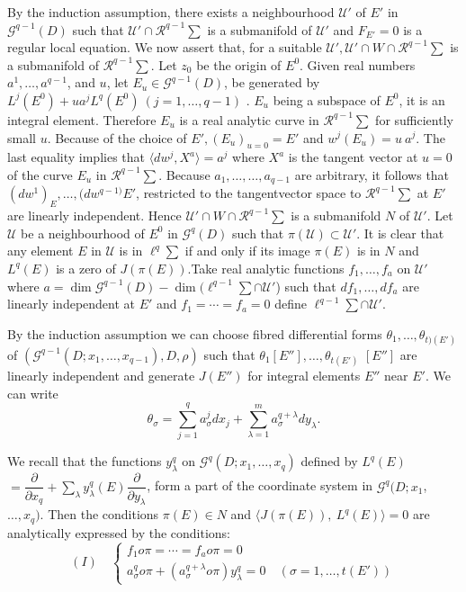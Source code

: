 By the induction assumption,  there exists a neighbourhood
$\mathscr{U}'$ of $E'$ in $\mathscr{G}^{q-1}(D)$ such that
$\mathscr{U}' \cap \mathscr{R}^{q-1} \sum$ is a submanifold of
$\mathscr{U}'$ and $F_{E'} = 0$ is a regular local equation. We now
assert that,  for a suitable $\mathscr{U}' ,  \mathscr{U}' \cap W \cap
\mathscr{R}^{q-1} \sum$ is a submanifold of $\mathscr{R}^{q-1}
\sum$. Let $z_0$ be the origin of $E^0$. Given real numbers $a^1,
\ldots,  a^{q-1}$,  and $u$,  let $E_u \in \mathscr{G}^{q-1}(D)$,  be
generated by $L^j (E^0)+ u a^j L^q (E^0) ~ (j = 1,  \ldots,  q-1)$
. $E_u$ being a subspace of $E^0$,  it is an integral
element. Therefore $E_u$ is a real analytic curve in
$\mathscr{R}^{q-1} \sum$ for sufficiently small $u$. Because of the
choice of $E' ,  (E_u)_{u = 0}= E'$ and $w^j (E_u) = u ~ a^j$. The
last equality implies that $\langle d w^j,  X^a \rangle = a^j$ where
$X^a$ is the tangent vector at $u = 0 $ of the curve $E_u$ in
$\mathscr{R}^{q-1} \sum$. Because $a_1,  \ldots , \ldots , a_{q-1}$
are arbitrary, it follows that $(dw^1)_E , \ldots , (dw^{q-1)} E'$,
restricted to the  tangent\pageoriginale vector space to $\mathscr{R}^{q-1} \sum$ at
$E'$ are linearly independent. Hence $\mathscr{U}' \cap W \cap
\mathscr{R}^{q-1} \sum$ is a submanifold $N$ of $\mathscr{U}'$. Let
$\mathscr{U}$ be a neighbourhood of $E^0$ in $\mathscr{G}^q (D)$ such
that $\pi (\mathscr{U}) \subset \mathscr{U}'$. It is clear that any
element $E$ in $\mathscr{U}$ is in $\ell^q \sum$ if and only if its
image $\pi (E)$ is in $N$ and $L^q (E)$ is a zero of $J (\pi
(E))$.Take real analytic functions $f_1,  \ldots ,  f_a$ on
$\mathscr{U}'$ where $a = \dim \mathscr{G}^{q-1} (D) - \dim
(\ell^{q-1} \sum \cap \mathscr{U}'$) such that $df_1,  \ldots ,  df_a$
are linearly independent at $E'$ and $f_1 = \cdots = f_a = 0$ define
$\ell ^{q-1} \sum \cap \mathscr{U}'$.  

By the induction assumption we can choose fibred differential forms
$\theta_1,  \ldots ,  \theta_{t )(E')}$ of $(\mathscr{G}^{q-1} (D; x_1
,  \ldots ,  x_{q-1}) ,  D,  \rho)$ such that $\theta_1 [E''],  \ldots
,  \theta_{t (E') }$ $[E'']$ are linearly independent and generate
$J(E'')$ for integral elements $E''$ near $E'$. We can write  
$$
\theta _\sigma = \sum_{j = 1}^q a^j_\sigma dx_j + \sum_{\lambda = 1}^m
a^{q+ \lambda}_\sigma dy_\lambda. 
$$

We recall that the functions $y^q_\lambda$ on $\mathscr{G}^q (D; x_1,
\ldots ,  x_q)$ defined by $L^q (E)$ $= \dfrac{\partial}{\partial x_q} +
\sum\limits_{\lambda} y^q_\lambda (E) \dfrac{\partial}{\partial
  y_\lambda}$,  form a part of the coordinate system in $\mathscr{G}^q
(D; x_1$,  $\ldots,  x_q)$. Then the conditions $\pi (E) \in N$ and
$\langle J (\pi (E)),  ~ L^q (E) \rangle = 0$ are analy\-tically
expressed by the conditions: 
\begin{equation*}
  (I)\quad 
  \begin{cases}
    f_1 o \pi = \cdots = f_a o \pi = 0&\\
    a^q_\sigma o \pi + (a^{q+ \lambda}_\sigma o \pi ) y^q_\lambda = 0&
    ~ (\sigma = 1,  \ldots,  t (E')) 
  \end{cases}
\end{equation*}


